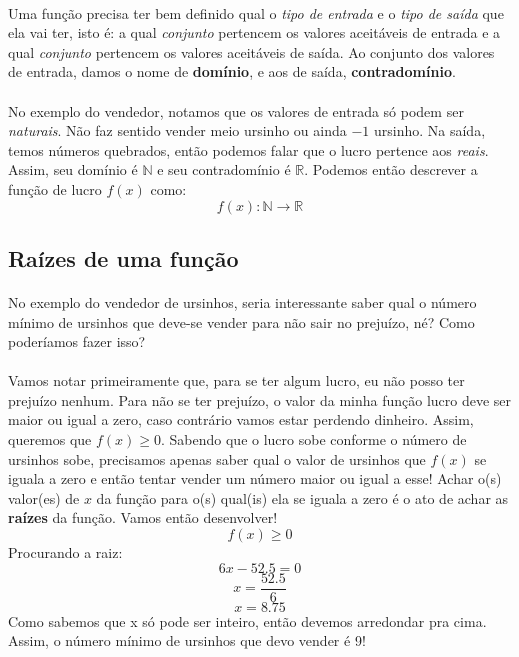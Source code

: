 \documentclass[11pt]{article}
\begin{document}
\paragraph{}
Uma função precisa ter bem definido qual o \emph{tipo de entrada} e o 
\emph{tipo de saída} que ela vai ter, isto é: a qual \emph{conjunto} 
pertencem os valores aceitáveis de entrada e a qual \emph{conjunto} pertencem
os valores aceitáveis de saída. Ao conjunto dos valores de entrada, damos
o nome de \textbf{domínio}, e aos de saída, \textbf{contradomínio}.
\paragraph{}
No exemplo do vendedor, notamos que os valores de entrada só podem ser 
\emph{naturais}. Não faz sentido vender meio ursinho ou ainda $-1$ ursinho.
Na saída, temos números quebrados, então podemos falar que o lucro pertence
aos \emph{reais}. Assim, seu domínio é $\mathbb{N}$ e seu contradomínio 
é $\mathbb{R}$. Podemos então descrever a função de lucro $f(x)$ como:
$$f(x): \mathbb{N} \rightarrow \mathbb{R}$$

\subsection{Raízes de uma função}
\paragraph{}
No exemplo do vendedor de ursinhos, seria interessante saber qual o número 
mínimo de ursinhos que deve-se vender para não sair no prejuízo, né? Como
poderíamos fazer isso?
\paragraph{}
Vamos notar primeiramente que, para se ter algum lucro, eu não posso ter
prejuízo nenhum. Para não se ter prejuízo, o valor da minha função lucro
deve ser maior ou igual a zero, caso contrário vamos estar perdendo dinheiro.
Assim, queremos que $f(x) \geq 0$. Sabendo que o lucro sobe conforme o 
número de ursinhos sobe, precisamos apenas saber qual o valor de ursinhos
que $f(x)$ se iguala a zero e então tentar vender um número maior ou igual
a esse! Achar o(s) valor(es) de $x$ da função para o(s) qual(is) ela se 
iguala a zero é o ato de achar as \textbf{raízes} da função. Vamos então
desenvolver!
$$f(x) \geq 0$$
Procurando a raiz:
$$6x - 52.5 = 0$$
$$x = \frac{52.5}{6}$$
$$x = 8.75$$
Como sabemos que x só pode ser inteiro, então devemos arredondar pra cima. 
Assim, o número mínimo de ursinhos que devo vender é 9!
\end{document}
